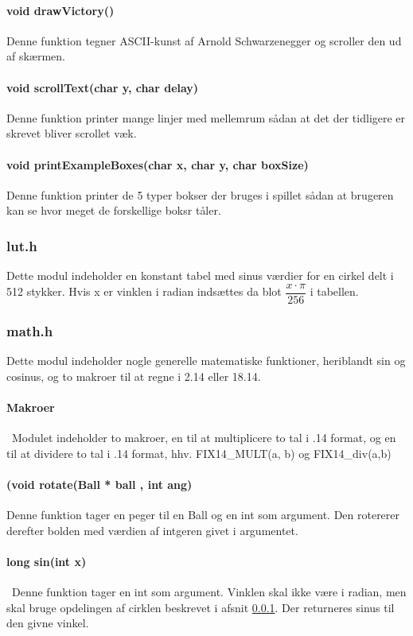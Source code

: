 \paragraph{void drawVictory()}
Denne funktion tegner ASCII-kunst af Arnold Schwarzenegger og scroller den ud af skærmen.

\paragraph{void scrollText(char y, char delay)}
Denne funktion printer mange linjer med mellemrum sådan at det der tidligere er skrevet bliver scrollet væk.

\paragraph{void printExampleBoxes(char x, char y, char boxSize)}
Denne funktion printer de 5 typer bokser der bruges i spillet sådan at brugeren kan se hvor meget de forskellige boksr tåler.

\subsubsection{lut.h}
\label{lut}
Dette modul indeholder en konstant tabel med sinus værdier for en cirkel delt i 512 stykker. Hvis x er vinklen i radian indsættes da blot $\dfrac{x\cdot \pi}{256}$ i tabellen.
\subsubsection{math.h}
Dette modul indeholder nogle generelle matematiske funktioner, heriblandt sin og cosinus, og to makroer til at regne i 2.14 eller 18.14.
\paragraph{Makroer}\
Modulet indeholder to makroer, en til at multiplicere to tal i .14 format, og en til at dividere to tal i .14 format, hhv. FIX14\_MULT(a, b) og FIX14\_div(a,b)

\paragraph{(void rotate(Ball * ball , int ang)}
Denne funktion tager en peger til en Ball og en int som argument. Den rotererer derefter bolden med værdien af intgeren givet i argumentet.

\paragraph{long sin(int x)}\
Denne funktion tager en int som argument. Vinklen skal ikke være i radian, men skal bruge opdelingen af cirklen beskrevet i afsnit \ref{lut}. Der returneres sinus til den givne vinkel.
